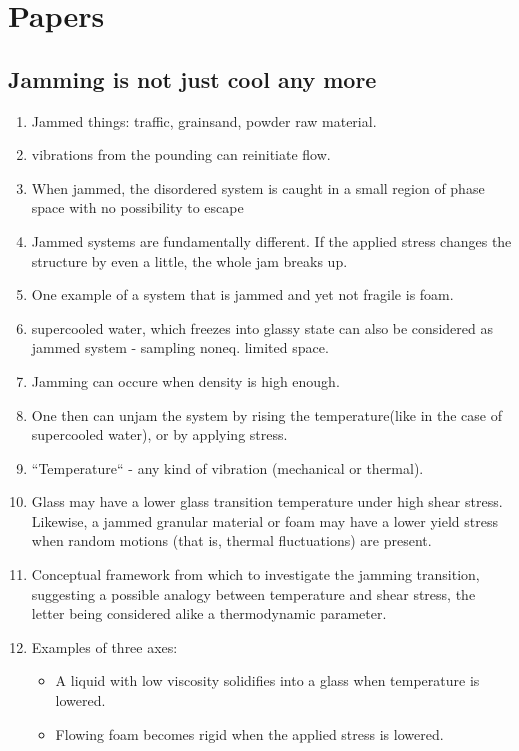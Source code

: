 \documentclass[10pt,a4paper]{article}
\begin{document}

\section{Papers}
\subsection{Jamming is not just cool any more\cite{nagel:98}}
\begin{enumerate}
 \item Jammed things: traffic, grainsand, powder raw material.
 \item vibrations from the pounding can reinitiate flow.
 \item When jammed, the disordered system is caught in a small region of phase space with no possibility to escape
 \item Jammed systems are fundamentally different. If the applied stress changes the structure by even a little, the whole jam breaks up. 
 \item One example of a system that is jammed and yet not fragile is foam.
 \item supercooled water, which freezes into glassy state can also be considered as jammed system - sampling noneq. limited space.
 \item Jamming can occure when density is high enough. 
 \item One then can unjam the system by rising the temperature(like in the case of supercooled water), or by applying stress. 
 \item ``Temperature`` - any kind of vibration (mechanical or thermal).
 \item Glass may have a lower glass transition temperature under high shear stress. 
 Likewise, a jammed granular material or foam may have a lower yield stress when random motions (that is, thermal fluctuations) are present.
 \item Conceptual framework from which to investigate the jamming transition, 
 suggesting a possible analogy between temperature and shear stress, the letter being considered alike a thermodynamic parameter.
 \item Examples of three axes:
 \begin{itemize}
  \item A liquid with low viscosity solidifies into a glass when temperature is lowered.
  \item Flowing foam becomes rigid when the applied stress is lowered.

\end{itemize}
\end{enumerate}
\end{document}
